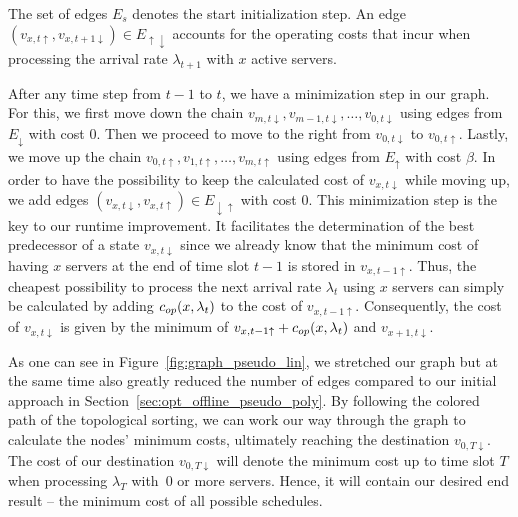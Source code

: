 The set of edges $E_s$ denotes the start initialization step. An edge $(v_{x,t\uparrow},v_{x,t+1\downarrow})\in E_{\uparrow\downarrow}$ accounts for the operating costs that incur when processing the arrival rate $\lambda_{t+1}$ with $x$ active servers.

After any time step from $t-1$ to $t$, we have a minimization step in our graph. For this, we first move down the chain $v_{m,t\downarrow},v_{m-1,t\downarrow},\dotsc,v_{0,t\downarrow}$ using edges from $E_\downarrow$ with cost $0$. Then we proceed to move to the right from $v_{0,t\downarrow}$ to $v_{0,t\uparrow}$. Lastly, we move up the chain $v_{0,t\uparrow},v_{1,t\uparrow},\dotsc,v_{m,t\uparrow}$ using edges from $E_\uparrow$ with cost $\beta$. In order to have the possibility to keep the calculated cost of $v_{x,t\downarrow}$ while moving up, we add edges $(v_{x,t\downarrow},v_{x,t\uparrow})\in E_{\downarrow\uparrow}$ with cost $0$.  
This minimization step is the key to our runtime improvement. It facilitates the determination of the best predecessor of a state $v_{x,t\downarrow}$ since we already know that the minimum cost of having $x$ servers at the end of time slot $t-1$ is stored in $v_{x,t-1\uparrow}$. Thus, the cheapest possibility to process the next arrival rate $\lambda_t$ using $x$ servers can simply be calculated by adding $c_{op}(x,\lambda_t)$ to the cost of $v_{x,t-1\uparrow}$. Consequently, the cost of $v_{x,t\downarrow}$ is given by the minimum of $v_{x,t-1\uparrow}+c_{op}(x,\lambda_t)$ and $v_{x+1,t\downarrow}$.

As one can see in Figure~\ref{fig:graph_pseudo_lin}, we stretched our graph but at the same time also greatly reduced the number of edges compared to our initial approach in Section~\ref{sec:opt_offline_pseudo_poly}. By following the colored path of the topological sorting, we can work our way through the graph to calculate the nodes' minimum costs, ultimately reaching the destination $v_{0,T\downarrow}$. The cost of our destination $v_{0,T\downarrow}$ will denote the minimum cost up to time slot $T$ when processing $\lambda_T$ with~$0$ or more servers. Hence, it will contain our desired end result -- the minimum cost of all possible schedules.

